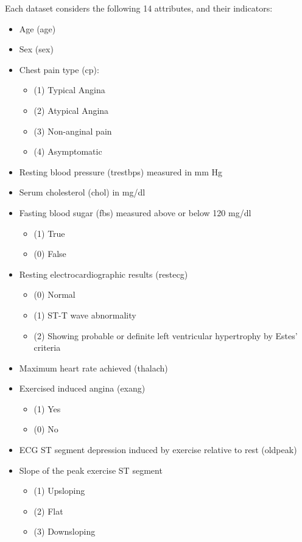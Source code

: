 \documentclass[conference]{IEEEtran}
\begin{document}
Each dataset considers the following 14 attributes, and their indicators:
\begin{itemize}
    \item Age (age)
    \item Sex (sex)
    \item Chest pain type (cp):
    \begin{itemize}
        \item (1) Typical Angina 
        \item (2) Atypical Angina 
        \item (3) Non-anginal pain 
        \item (4) Asymptomatic
    \end{itemize}
    \item Resting blood pressure (trestbps) measured in mm Hg 
    \item Serum cholesterol (chol) in mg/dl
    \item Fasting blood sugar (fbs) measured above or below 120 mg/dl
    \begin{itemize}
        \item (1) True 
        \item (0) False 
    \end{itemize}
    \item Resting electrocardiographic results (restecg)
    \begin{itemize}
        \item (0) Normal 
        \item (1) ST-T wave abnormality 
        \item (2) Showing probable or definite left ventricular hypertrophy by Estes' criteria 
    \end{itemize}
    \item Maximum heart rate achieved (thalach)
    \item Exercised induced angina (exang)
    \begin{itemize}
        \item (1) Yes 
        \item (0) No 
    \end{itemize}
    \item ECG ST segment depression induced by exercise relative to rest (oldpeak)
    \item Slope of the peak exercise ST segment 
    \begin{itemize}
        \item (1) Upsloping 
        \item (2) Flat 
        \item (3) Downsloping 

\end{itemize}
\end{itemize}
\end{document}
